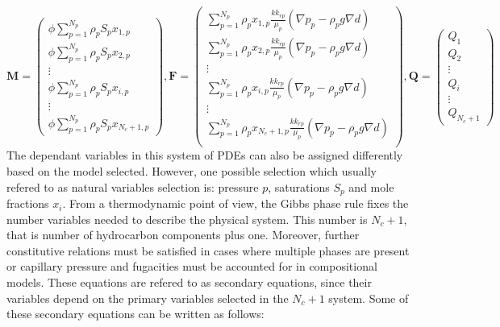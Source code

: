 \begin{equation}
	\mathbf{M} = 
\begin{pmatrix}
	\phi\sum_{p=1}^{N_{p}}\rho_{p}S_{p}x_{1,p} \\
	\phi\sum_{p=1}^{N_{p}}\rho_{p}S_{p}x_{2,p} \\
	\vdots\\
	\phi\sum_{p=1}^{N_{p}}\rho_{p}S_{p}x_{i,p} \\
	\vdots\\
	\phi\sum_{p=1}^{N_{p}}\rho_{p}S_{p}x_{N_{c}+1,p} 
\end{pmatrix}
,\mathbf{F} = 
\begin{pmatrix}
	\sum_{p=1}^{N_{p}}\rho_{p}x_{1,p}\frac{kk_{rp}}{\mu_{p}}(\nabla p_{p}-\rho_{p}g\nabla d)\\
	\sum_{p=1}^{N_{p}}\rho_{p}x_{2,p}\frac{kk_{rp}}{\mu_{p}}(\nabla p_{p}-\rho_{p}g\nabla d)\\
	\vdots\\
	\sum_{p=1}^{N_{p}}\rho_{p}x_{i,p}\frac{kk_{rp}}{\mu_{p}}(\nabla p_{p}-\rho_{p}g\nabla d)\\
	\vdots\\
	\sum_{p=1}^{N_{p}}\rho_{p}x_{N_{c} + 1,p}\frac{kk_{rp}}{\mu_{p}}(\nabla p_{p}-\rho_{p}g\nabla d)\\
\end{pmatrix}
,\mathbf{Q} = 
\begin{pmatrix}
	Q_{1}\\
	Q_{2}\\
	\vdots\\
	Q_{i}\\
	\vdots\\
	Q_{N_{c}+1}
\end{pmatrix}
\end{equation}
The dependant variables in this system of PDEs can also be assigned differently based on the model selected. However, one possible selection which usually refered to as natural variables selection\supercite{cao} is: 
pressure $p$, saturations $S_{p}$ and mole fractions $x_{i}$. From a thermodynamic point of view, the Gibbs phase rule fixes the number variables needed to describe the physical system. This number is $N_{c} + 1$, that is
number of hydrocarbon components plus one\supercite{cao}. Moreover, further constitutive relations must be satisfied in cases where multiple phases are present or capillary pressure and fugacities must be accounted for in
compositional models. These equations are refered to as secondary equations, since their variables depend on the primary variables selected in the $N_{c} + 1$ system. Some of these secondary equations can be written as follows:

